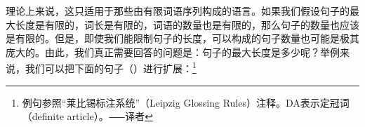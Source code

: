 理论上来说，这只适用于那些由有限词语序列构成的语言。如果我们假设句子的最大长度是有限的，词长是有限的，词语的数量也是有限的，那么句子的数量也应该是有限的。但是，即使我们能限制句子的长度，可以构成的句子数量也可能是极其庞大的。由此，我们真正需要回答的问题是：句子的最大长度是多少呢？举例来说，我们可以把下面的句子（）进行扩展：\footnote{
例句参照“莱比锡标注系统”（Leipzig Glossing Rules）注释。DA表示定冠词（definite article）。⸺译者}

